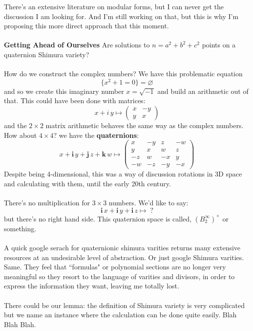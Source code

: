 \documentclass[12pt]{article}
\begin{document}
There's an extensive literature on modular forms, but I can never get the discussion I am looking for.  And I'm still working on that, but this is why I'm proposing this more direct approach that this moment. \\\\
\textbf{Getting Ahead of Ourselves}  Are solutions to $n = a^2 + b^2 + c^2$ points on a quaternion Shimura variety? \\ \\
How do we construct the complex numbers?  We have this problematic equation 
$$ \big\{ x^2 + 1 = 0 \big\} = \varnothing $$
and so we create this imaginary number $x = \sqrt{-1}$ and build an arithmetic out of that.  This could have been done with matrices:
$$ x + i\, y \mapsto \left( \begin{array}{cr} x & -y \\ y & x \end{array} \right) $$
and the $2 \times 2$ matrix arithmetic behaves the same way as the complex numbers.  How about $4 \times 4$? we have the \textbf{quaternions}:
$$ x + \textbf{i}\, y + \textbf{j}\, z + \textbf{k}\, w \mapsto \left(
\begin{array}{rrrr} 
x & -y & z & -w \\
y & x & w & z \\
-z & w & -x & y \\
-w & -z & -y & -x \end{array}
\right)$$
Despite being 4-dimensional, this was a way of discussion rotations in 3D space and calculating with them, until the early 20th century. \\ \\
There's no multiplication for $3 \times 3$ numbers. We'd like to say:
$$ \textbf{i}\, x +\textbf{i}\, y +\textbf{i}\, z  \mapsto \;? $$
but there's no right hand side. This quaternion space is called, $(B_2^\infty)^\times$ or something.\\ \\
A quick google serach for {\color{purple}quaternionic shimura varities} returns many extensive resources at an undesirable level of abstraction. 
 Or just google {\color{green!50!purple}Shimura varities}. Same. They feel that ``formulas" or polynomial sections are no longer very meaningful so they resort to the language of varities and divisors, in order to express the information they want, leaving me totally lost.  \\ \\There could be our lemma: the definition of Shimura variety is very complicated but we name an instance where the calculation can be done quite easily. \hfill  Blah Blah Blah.\\ \\
\end{document}
